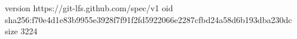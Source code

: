 version https://git-lfs.github.com/spec/v1
oid sha256:f70e4d1e83b9955e3928f7f91f2fd5922066e2287cfbd24a58d6b193dba230dc
size 3224

